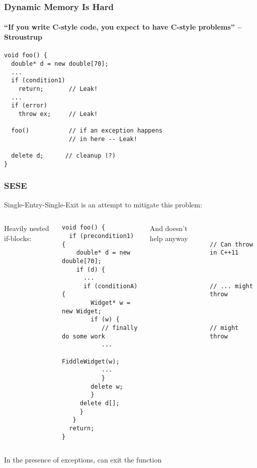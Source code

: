 
\begin{frame}[fragile,t]
\frametitle{Dynamic Memory Is Hard}
\framesubtitle{``If you write C-style code, you expect to have C-style problems'' -- Stroustrup}

{\scriptsize \begin{verbatim}
void foo() {
  double* d = new double[70];
  ...
  if (condition1)
    return;       // Leak!
  ...
  if (error)
    throw ex;     // Leak!

  foo()           // if an exception happens
                  // in here -- Leak!

  delete d;      // cleanup (?)
}
\end{verbatim}}
\end{frame}




\begin{frame}[fragile,t]
\frametitle{SESE}
Single-Entry-Single-Exit is an attempt to mitigate this problem:

\begin{columns}[t]
Heavily nested if-blocks:
{\scriptsize\begin{verbatim}
void foo() {
  if (precondition1) {
    double* d = new double[70];
    if (d) {
      ...
      if (conditionA) {
        Widget* w = new Widget;
        if (w) {
           // finally do some work
           ...
           FiddleWidget(w);
           ...
           }
        delete w;
        }
     delete d[];
     }
   }
  return;
}
\end{verbatim}}
\pause{}
And doesn't help anyway
{\scriptsize\begin{verbatim}


// Can throw in C++11



// ... might throw



// might throw






\end{verbatim}}
\end{columns}
\pause{}
In the presence of exceptions,  can exit the function
\end{frame}



